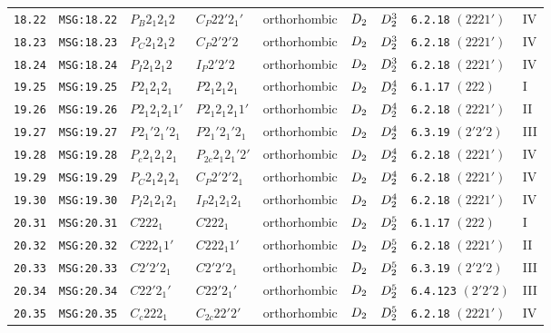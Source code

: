 \documentclass[fleqn,10pt]{jsarticle}
\begin{document}
\begin{center}
\begin{longtable}{lllllllll}
\texttt{18.22} & \texttt{MSG:18.22} & $P_{B}2_{1}2_{1}2$ & $C_{P}22'2_{1}'$ & orthorhombic & $D_{\rm 2}$ & $D_{\rm 2}^{3}$ & \texttt{6.2.18} $(2221')$ & IV \\
\texttt{18.23} & \texttt{MSG:18.23} & $P_{C}2_{1}2_{1}2$ & $C_{P}2'2'2$ & orthorhombic & $D_{\rm 2}$ & $D_{\rm 2}^{3}$ & \texttt{6.2.18} $(2221')$ & IV \\
\texttt{18.24} & \texttt{MSG:18.24} & $P_{I}2_{1}2_{1}2$ & $I_{P}2'2'2$ & orthorhombic & $D_{\rm 2}$ & $D_{\rm 2}^{3}$ & \texttt{6.2.18} $(2221')$ & IV \\ \hline
\texttt{19.25} & \texttt{MSG:19.25} & $P2_{1}2_{1}2_{1}$ & $P2_{1}2_{1}2_{1}$ & orthorhombic & $D_{\rm 2}$ & $D_{\rm 2}^{4}$ & \texttt{6.1.17} $(222)$ & I \\
\texttt{19.26} & \texttt{MSG:19.26} & $P2_{1}2_{1}2_{1}1'$ & $P2_{1}2_{1}2_{1}1'$ & orthorhombic & $D_{\rm 2}$ & $D_{\rm 2}^{4}$ & \texttt{6.2.18} $(2221')$ & II \\
\texttt{19.27} & \texttt{MSG:19.27} & $P2_{1}'2_{1}'2_{1}$ & $P2_{1}'2_{1}'2_{1}$ & orthorhombic & $D_{\rm 2}$ & $D_{\rm 2}^{4}$ & \texttt{6.3.19} $(2'2'2)$ & III \\
\texttt{19.28} & \texttt{MSG:19.28} & $P_{c}2_{1}2_{1}2_{1}$ & $P_{2c}2_{1}2_{1}'2'$ & orthorhombic & $D_{\rm 2}$ & $D_{\rm 2}^{4}$ & \texttt{6.2.18} $(2221')$ & IV \\
\texttt{19.29} & \texttt{MSG:19.29} & $P_{C}2_{1}2_{1}2_{1}$ & $C_{P}2'2'2_{1}$ & orthorhombic & $D_{\rm 2}$ & $D_{\rm 2}^{4}$ & \texttt{6.2.18} $(2221')$ & IV \\
\texttt{19.30} & \texttt{MSG:19.30} & $P_{I}2_{1}2_{1}2_{1}$ & $I_{P}2_{1}2_{1}2_{1}$ & orthorhombic & $D_{\rm 2}$ & $D_{\rm 2}^{4}$ & \texttt{6.2.18} $(2221')$ & IV \\ \hline
\texttt{20.31} & \texttt{MSG:20.31} & $C222_{1}$ & $C222_{1}$ & orthorhombic & $D_{\rm 2}$ & $D_{\rm 2}^{5}$ & \texttt{6.1.17} $(222)$ & I \\
\texttt{20.32} & \texttt{MSG:20.32} & $C222_{1}1'$ & $C222_{1}1'$ & orthorhombic & $D_{\rm 2}$ & $D_{\rm 2}^{5}$ & \texttt{6.2.18} $(2221')$ & II \\
\texttt{20.33} & \texttt{MSG:20.33} & $C2'2'2_{1}$ & $C2'2'2_{1}$ & orthorhombic & $D_{\rm 2}$ & $D_{\rm 2}^{5}$ & \texttt{6.3.19} $(2'2'2)$ & III \\
\texttt{20.34} & \texttt{MSG:20.34} & $C22'2_{1}'$ & $C22'2_{1}'$ & orthorhombic & $D_{\rm 2}$ & $D_{\rm 2}^{5}$ & \texttt{6.4.123} $(2'2'2)$ & III \\
\texttt{20.35} & \texttt{MSG:20.35} & $C_{c}222_{1}$ & $C_{2c}22'2'$ & orthorhombic & $D_{\rm 2}$ & $D_{\rm 2}^{5}$ & \texttt{6.2.18} $(2221')$ & IV \\

\end{longtable}
\end{center}
\end{document}
